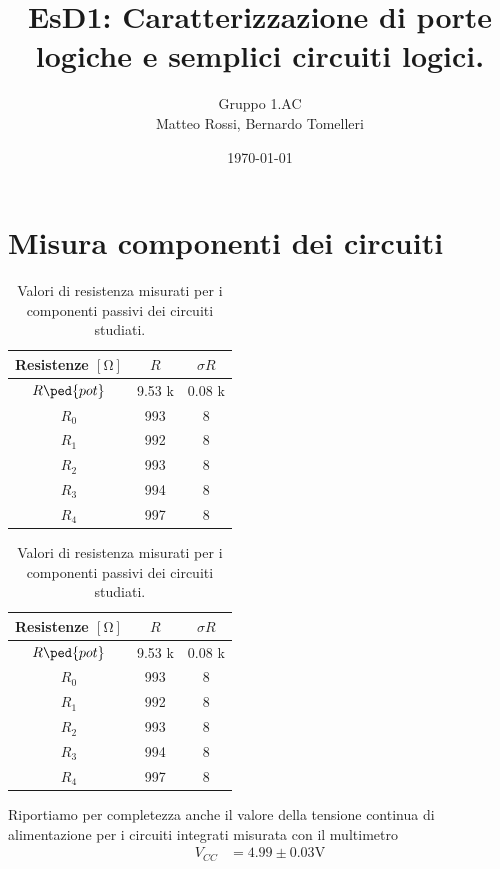 \documentclass[10pt, a4paper, italian]{article}
\author{Gruppo 1.AC \\ Matteo Rossi, Bernardo Tomelleri}
\title{EsD1: Caratterizzazione di porte logiche e semplici circuiti logici.}
\begin{document}
\date{\today}
\maketitle

\setcounter{section}{0}

\section{Misura componenti dei circuiti}
\begin{table}[htbp]
\centering
\begin{tabular}{ccc}
\toprule
Resistenze $[\si{\ohm}]$ & $R$ & $\sigma R$ \\
\midrule
\midrule
$R\ped{pot}$	& 9.53 k	& 0.08 k 		\\
$R_0$	  		& 993		& 8				\\
$R_1$	  		& 992		& 8	 			\\
$R_2$	  		& 993		& 8	 			\\
$R_3$	  		& 994		& 8	 			\\
$R_4$	  		& 997		& 8	 			\\
\bottomrule     
\end{tabular}
\caption{Valori di resistenza misurati per i componenti passivi dei circuiti
studiati. \label{tab: rmesB}}
\end{table}

\begin{table}[htbp]
\centering
\begin{tabular}{ccc}
\toprule
Resistenze $[\si{\ohm}]$ & $R$ & $\sigma R$ \\
\midrule
\midrule
$R\ped{pot}$	& 9.53 k	& 0.08 k 		\\
$R_0$	  		& 993		& 8				\\
$R_1$	  		& 992		& 8	 			\\
$R_2$	  		& 993		& 8	 			\\
$R_3$	  		& 994		& 8	 			\\
$R_4$	  		& 997		& 8	 			\\
\bottomrule     
\end{tabular}
\caption{Valori di resistenza misurati per i componenti passivi dei circuiti
studiati. \label{tab: rmesM}}
\end{table}

Riportiamo per completezza anche il valore della tensione continua di
alimentazione per i circuiti integrati misurata con il multimetro
\begin{align*}
V_{CC} &= 4.99 \pm 0.03 \si{\V} \\
\end{align*}
\end{document}
